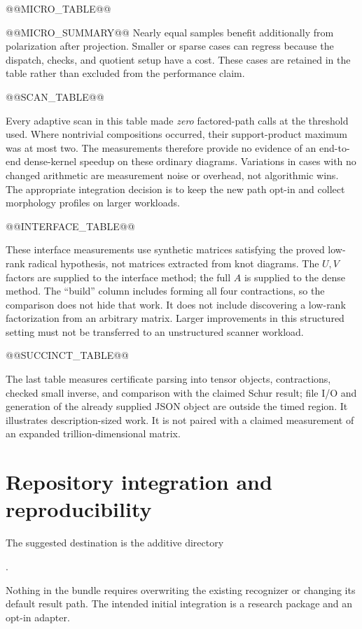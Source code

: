 \documentclass[11pt]{article}
\theoremstyle{definition}\newtheorem{definition}[theorem]{Definition}
\theoremstyle{remark}\newtheorem{remark}[theorem]{Remark}
\begin{document}
@@MICRO_TABLE@@

@@MICRO_SUMMARY@@ Nearly equal samples benefit additionally from polarization after projection. Smaller or sparse cases can regress because the dispatch, checks, and quotient setup have a cost. These cases are retained in the table rather than excluded from the performance claim.

@@SCAN_TABLE@@

Every adaptive scan in this table made \emph{zero} factored-path calls at the threshold used. Where nontrivial compositions occurred, their support-product maximum was at most two. The measurements therefore provide no evidence of an end-to-end dense-kernel speedup on these ordinary diagrams. Variations in cases with no changed arithmetic are measurement noise or overhead, not algorithmic wins. The appropriate integration decision is to keep the new path opt-in and collect morphology profiles on larger workloads.

@@INTERFACE_TABLE@@

These interface measurements use synthetic matrices satisfying the proved low-rank radical hypothesis, not matrices extracted from knot diagrams. The $U,V$ factors are supplied to the interface method; the full $A$ is supplied to the dense method. The ``build'' column includes forming all four contractions, so the comparison does not hide that work. It does not include discovering a low-rank factorization from an arbitrary matrix. Larger improvements in this structured setting must not be transferred to an unstructured scanner workload.

@@SUCCINCT_TABLE@@

The last table measures certificate parsing into tensor objects, contractions, checked small inverse, and comparison with the claimed Schur result; file I/O and generation of the already supplied JSON object are outside the timed region. It illustrates description-sized work. It is not paired with a claimed measurement of an expanded trillion-dimensional matrix.

\section{Repository integration and reproducibility}
\label{sec:integration}
The suggested destination is the additive directory
\begin{center}
.
\end{center}
Nothing in the bundle requires overwriting the existing recognizer or changing its default result path. The intended initial integration is a research package and an opt-in adapter.
\end{document}
